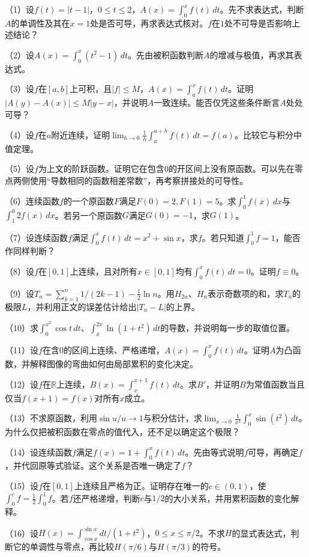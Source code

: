 \newpage
\begin{exercise}[本节习题]
\label{exs:calculus-fundamental-theorem}
\setlength{\parskip}{3.5pt}
\mbox{}\par\nobreak

（1）设\(f(t)=|t-1|\)，\(0\le t\le2\)，\(A(x)=\int_0^xf(t)\,dt\)。先不求表达式，判断\(A\)的单调性及其在\(x=1\)处是否可导，再求表达式核对。\(f\)在\(1\)处不可导是否影响上述结论？

（2）设\(A(x)=\int_0^x(t^2-1)\,dt\)。先由被积函数判断\(A\)的增减与极值，再求其表达式。

（3）设\(f\)在\([a,b]\)上可积，且\(|f|\le M\)，\(A(x)=\int_a^xf(t)\,dt\)。证明\(|A(y)-A(x)|\le M|y-x|\)，并说明\(A\)一致连续。能否仅凭这些条件断言\(A\)处处可导？

（4）设\(f\)在\(a\)附近连续，证明\(\displaystyle\lim_{h\to0}\frac1h\int_a^{a+h}f(t)\,dt=f(a)\)。比较它与积分中值定理。

（5）设\(f\)为上文的阶跃函数。证明它在包含\(0\)的开区间上没有原函数。可以先在零点两侧使用“导数相同的函数相差常数”，再考察拼接处的可导性。

（6）连续函数\(f\)的一个原函数\(F\)满足\(F(0)=2,F(1)=5\)。求\(\int_0^1f(x)\,dx\)与\(\int_1^0 2f(x)\,dx\)。若另一个原函数\(G\)满足\(G(0)=-1\)，求\(G(1)\)。

（7）设连续函数\(f\)满足\(\int_0^x f(t)\,dt=x^2+\sin x\)，求\(f\)。若只知道\(\int_0^1 f=1\)，能否作同样判断？

（8）设\(f\)在\([0,1]\)上连续，且对所有\(x\in[0,1]\)均有\(\int_0^x f(t)\,dt=0\)。证明\(f\equiv0\)。

（9）设\(T_n=\sum_{k=1}^n1/(2k-1)-\tfrac12\ln n\)。用\(H_{2n}\)、\(H_n\)表示奇数项的和，求\(T_n\)的极限\(L\)，并利用正文的误差估计给出\(|T_n-L|\)的上界。

（10）求\(\int_0^{x^2}\cos t\,dt\)、\(\int_x^{2x}\ln(1+t^2)\,dt\)的导数，并说明每一步的取值位置。

（11）设\(f\)在含\(0\)的区间上连续、严格递增，\(A(x)=\int_0^x f(t)\,dt\)。证明\(A\)为凸函数，并解释图像的弯曲如何由局部累积的变化决定。

（12）设\(f\)在\(\mathbb R\)上连续，\(B(x)=\int_x^{x+1}f(t)\,dt\)。求\(B'\)，并证明\(B\)为常值函数当且仅当\(f(x+1)=f(x)\)对所有\(x\)成立。

（13）不求原函数，利用\(\sin u/u\to1\)与积分估计，求\(\displaystyle\lim_{x\to0}\frac1{x^3}\int_0^x\sin(t^2)\,dt\)。为什么仅把被积函数在零点的值代入，还不足以确定这个极限？

（14）设连续函数\(f\)满足\(f(x)=1+\int_0^xf(t)\,dt\)。先由等式说明\(f\)可导，再确定\(f\)，并代回原等式验证。这个关系是否唯一确定了\(f\)？

（15）设\(f\)在\([0,1]\)上连续且严格为正。证明存在唯一的\(c\in(0,1)\)，使\(\int_0^cf=\tfrac12\int_0^1f\)。若\(f\)还严格递增，判断\(c\)与\(1/2\)的大小关系，并用累积函数的变化解释。

（16）设\(H(x)=\int_{\cos x}^{\sin x}dt/(1+t^2)\)，\(0\le x\le\pi/2\)。不求\(H\)的显式表达式，判断它的单调性与零点，再比较\(H(\pi/6)\)与\(H(\pi/3)\)的符号。
\end{exercise}

